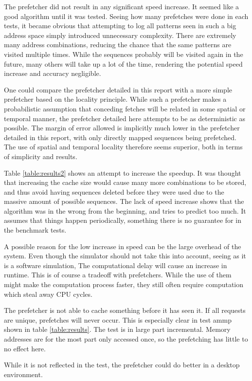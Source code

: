 The prefetcher did not result in any significant speed increase. It seemed like a good algorithm until it was tested. Seeing how many prefetches were done in each tests, it became obvious that attempting to log all patterns seen in such a big address space simply introduced unnecessary complexity. There are extremely many address combinations, reducing the chance that the same patterns are visited multiple times. While the sequences probably will be visited again in the future, many others will take up a lot of the time, rendering the potential speed increase and accuracy negligible. 

One could compare the prefetcher detailed in this report with a more simple prefetcher based on the locality principle. While such a prefetcher makes a probabilistic assumption that conceding fetches will be related in some spatial or temporal manner, the prefetcher detailed here attempts to be as deterministic as possible. The margin of error allowed is implicitly much lower in the prefetcher detailed in this report, with only directly mapped sequences being prefetched. The use of spatial and temporal locality therefore seems superior, both in terms of simplicity and results.

Table \ref{table:results2} shows an attempt to increase the speedup. It was thought that increasing the cache size would cause many more combinations to be stored, and thus avoid having sequences deleted before they were used due to the massive amount of possible sequences. The lack of speed increase shows that the algorithm was in the wrong from the beginning, and tries to predict too much. It assumes that things happen periodically, something there is no guarantee for in the benchmark tests. 

A possible reason for the low increase in speed can be the large overhead of the system. Even though the simulator should not take this into account, seeing as it is a software simulation, The computational delay will cause an increase in runtime. This is of course a tradeoff with prefetchers. While the use of them might make the computation process faster, they still often require computation which steal away CPU cycles.

The prefetcher is not able to cache something before it has seen it. If all requests are unique, prefetches will never occur. This is especially clear in test ammp shown in table \ref{table:results}. The test is in large part incremental. Memory addresses are for the most part only accessed once, so the prefetching has little to no effect here.

While it is not reflected in the test, the prefetcher could do better in a desktop environment. 

%
%
%
